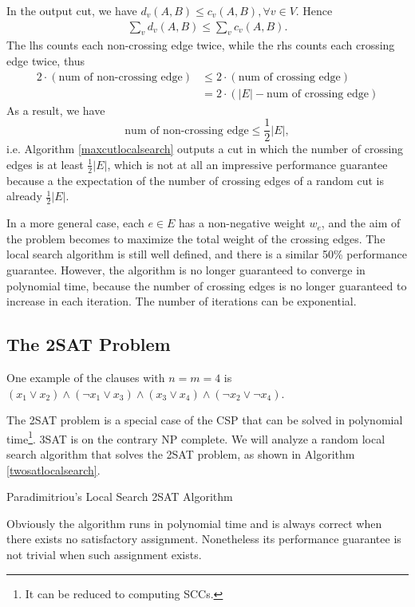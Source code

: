 In the output cut, we have $d_v(A,B)\leq c_v(A,B),\forall v\in V$. Hence 
\begin{align*}
\sum_vd_v(A,B)\leq \sum_vc_v(A,B).
\end{align*}
The lhs counts each non-crossing edge twice, while the rhs counts each crossing edge twice, thus 
\begin{align*}
2\cdot(\text{num of non-crossing edge})&\leq 2\cdot(\text{num of crossing edge})\\
&=2\cdot(\lvert E\rvert-\text{num of crossing edge})
\end{align*}
As a result, we have 
$$\text{num of non-crossing edge}\leq\frac{1}{2}\lvert E\rvert,$$ i.e. Algorithm \ref{maxcutlocalsearch} outputs a cut in which the number of crossing edges is at least $\frac{1}{2}\lvert E\rvert$, which is not at all an impressive performance guarantee because a the expectation of the number of crossing edges of a random cut is already $\frac{1}{2}\lvert E\rvert$.

In a more general case, each $e\in E$ has a non-negative weight $w_e$, and the aim of the problem becomes to maximize the total weight of the crossing edges. The local search algorithm is still well defined, and there is a similar 50\% performance guarantee. However, the algorithm is no longer guaranteed to converge in polynomial time, because the number of crossing edges is no longer guaranteed to increase in each iteration. The number of iterations can be exponential.
\subsection{The 2SAT Problem}
\begin{description}
\end{description}
One example of the clauses with $n=m=4$ is $(x_1\lor x_2)\land(\neg x_1\lor x_3)\land(x_3\lor x_4)\land(\neg x_2\lor\neg x_4)$.

The 2SAT problem is a special case of the CSP that can be solved in polynomial time\footnote{It can be reduced to computing SCCs.}. 3SAT is on the contrary NP complete. We will analyze a random local search algorithm that solves the 2SAT problem, as shown in Algorithm \ref{twosatlocalsearch}.
\begin{algorithm}[ht]
\caption{Paradimitriou's Local Search 2SAT Algorithm}\label{twosatlocalsearch}
\begin{algorithmic}[1]
\Else{}
\EndIf\EndFor\EndFor
{}
\end{algorithmic}
\end{algorithm}
Obviously the algorithm runs in polynomial time and is always correct when there exists no satisfactory assignment. Nonetheless its performance guarantee is not trivial when such assignment exists.

